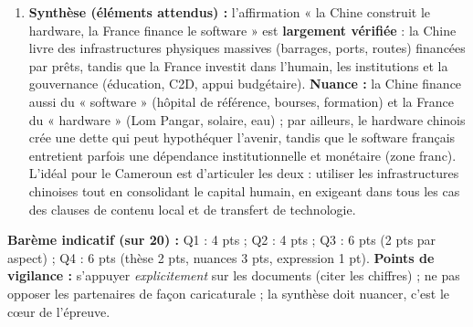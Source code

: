 \documentclass[11pt]{article}
\begin{document}
\begin{corrige}
\begin{enumerate}
\item \textbf{Synthèse (éléments attendus) :} l'affirmation « la Chine construit le hardware, la France finance le software » est \textbf{largement vérifiée} : la Chine livre des infrastructures physiques massives (barrages, ports, routes) financées par prêts, tandis que la France investit dans l'humain, les institutions et la gouvernance (éducation, C2D, appui budgétaire). \textbf{Nuance :} la Chine finance aussi du « software » (hôpital de référence, bourses, formation) et la France du « hardware » (Lom Pangar, solaire, eau) ; par ailleurs, le hardware chinois crée une dette qui peut hypothéquer l'avenir, tandis que le software français entretient parfois une dépendance institutionnelle et monétaire (zone franc). L'idéal pour le Cameroun est d'articuler les deux : utiliser les infrastructures chinoises tout en consolidant le capital humain, en exigeant dans tous les cas des clauses de contenu local et de transfert de technologie.
\end{enumerate}
\textbf{Barème indicatif (sur 20) :} Q1 : 4 pts ; Q2 : 4 pts ; Q3 : 6 pts (2 pts par aspect) ; Q4 : 6 pts (thèse 2 pts, nuances 3 pts, expression 1 pt).
\textbf{Points de vigilance :} s'appuyer \emph{explicitement} sur les documents (citer les chiffres) ; ne pas opposer les partenaires de façon caricaturale ; la synthèse doit nuancer, c'est le cœur de l'épreuve.
\end{corrige}
\end{document}
